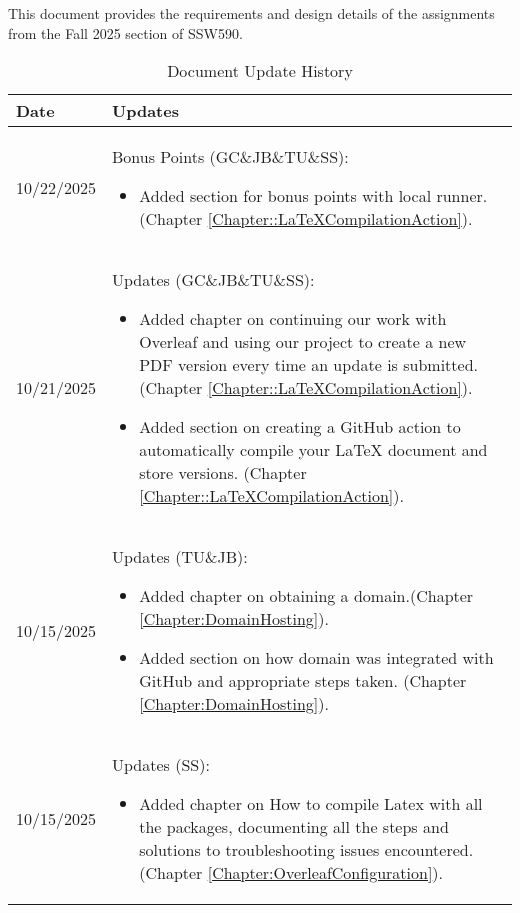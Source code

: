 This document provides the requirements and design details of the
assignments from the Fall 2025 section of SSW590.


\begin{longtable}{|l||p{13.5cm}|}
\caption{Document Update History \label{Table::UpdateHistory}}\\
\hline
\textbf{Date} & \textbf{Updates} \\
\hline 
\endhead

10/22/2025 & Bonus Points (GC\&JB\&TU\&SS):
\begin{itemize}[topsep=0pt,itemsep=0pt,parsep=0pt,partopsep=0pt,leftmargin=12pt]
\item Added section for bonus points with local runner. (Chapter \ref{Chapter::LaTeXCompilationAction}). 
\end{itemize} 
\\ \hline

10/21/2025 & Updates (GC\&JB\&TU\&SS):
\begin{itemize}[topsep=0pt,itemsep=0pt,parsep=0pt,partopsep=0pt,leftmargin=12pt]
\item Added chapter on continuing our work with Overleaf and using our project to create a new PDF version every time an update is submitted.(Chapter \ref{Chapter::LaTeXCompilationAction}). 
\item Added section on creating a GitHub action to automatically compile your LaTeX document and store versions. (Chapter \ref{Chapter::LaTeXCompilationAction}).
\end{itemize} 
\\ \hline

10/15/2025 & Updates (TU\&JB):
\begin{itemize}[topsep=0pt,itemsep=0pt,parsep=0pt,partopsep=0pt,leftmargin=12pt]
\item Added chapter on obtaining a domain.(Chapter \ref{Chapter:DomainHosting}). 
\item Added section on how domain was integrated with GitHub and appropriate steps taken. (Chapter \ref{Chapter:DomainHosting}).
\end{itemize} 
\\ \hline

10/15/2025 & Updates (SS):
\begin{itemize}[topsep=0pt,itemsep=0pt,parsep=0pt,partopsep=0pt,leftmargin=12pt]
\item Added chapter on How to compile Latex with all the packages, documenting all the steps and solutions to troubleshooting issues encountered.(Chapter \ref{Chapter:OverleafConfiguration}). 
\end{itemize} 
\\ \hline


\end{longtable}
